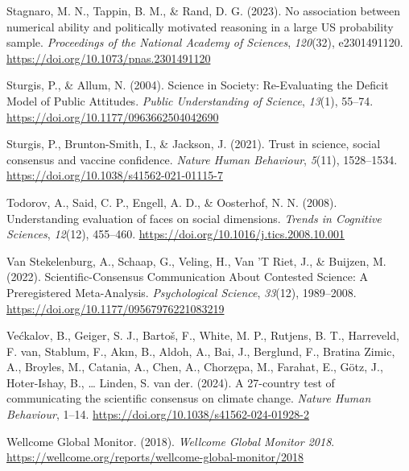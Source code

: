 \documentclass[
  jou,
  floatsintext,
  longtable,
  nolmodern,
  notxfonts,
  notimes,
  colorlinks=true,linkcolor=blue,citecolor=blue,urlcolor=blue]{apa7}
\newlength{\cslhangindent}
\newenvironment{CSLReferences}[2] %
 {\begin{list}{}{%
  \setlength{\itemindent}{0pt}
  \setlength{\leftmargin}{0pt}
  \setlength{\parsep}{0pt}
  \ifodd #1
   \setlength{\leftmargin}{\cslhangindent}
   \setlength{\itemindent}{-1\cslhangindent}
  \fi
  \setlength{\itemsep}{#2\baselineskip}}}
 {\end{list}}
\begin{document}
\begin{CSLReferences}{1}{0}
Stagnaro, M. N., Tappin, B. M., \& Rand, D. G. (2023). No association
between numerical ability and politically motivated reasoning in a large
US probability sample. \emph{Proceedings of the National Academy of
Sciences}, \emph{120}(32), e2301491120.
\url{https://doi.org/10.1073/pnas.2301491120}

Sturgis, P., \& Allum, N. (2004). Science in Society: Re-Evaluating the
Deficit Model of Public Attitudes. \emph{Public Understanding of
Science}, \emph{13}(1), 55--74.
\url{https://doi.org/10.1177/0963662504042690}

Sturgis, P., Brunton-Smith, I., \& Jackson, J. (2021). Trust in science,
social consensus and vaccine confidence. \emph{Nature Human Behaviour},
\emph{5}(11), 1528--1534.
\url{https://doi.org/10.1038/s41562-021-01115-7}

Todorov, A., Said, C. P., Engell, A. D., \& Oosterhof, N. N. (2008).
Understanding evaluation of faces on social dimensions. \emph{Trends in
Cognitive Sciences}, \emph{12}(12), 455--460.
\url{https://doi.org/10.1016/j.tics.2008.10.001}

Van Stekelenburg, A., Schaap, G., Veling, H., Van 'T Riet, J., \&
Buijzen, M. (2022). Scientific-Consensus Communication About Contested
Science: A Preregistered Meta-Analysis. \emph{Psychological Science},
\emph{33}(12), 1989--2008.
\url{https://doi.org/10.1177/09567976221083219}

Većkalov, B., Geiger, S. J., Bartoš, F., White, M. P., Rutjens, B. T.,
Harreveld, F. van, Stablum, F., Akın, B., Aldoh, A., Bai, J., Berglund,
F., Bratina Zimic, A., Broyles, M., Catania, A., Chen, A., Chorzępa, M.,
Farahat, E., Götz, J., Hoter-Ishay, B., \ldots{} Linden, S. van der.
(2024). A 27-country test of communicating the scientific consensus on
climate change. \emph{Nature Human Behaviour}, 1--14.
\url{https://doi.org/10.1038/s41562-024-01928-2}

Wellcome Global Monitor. (2018). \emph{Wellcome Global Monitor 2018}.
\url{https://wellcome.org/reports/wellcome-global-monitor/2018}


\end{CSLReferences}
\end{document}
